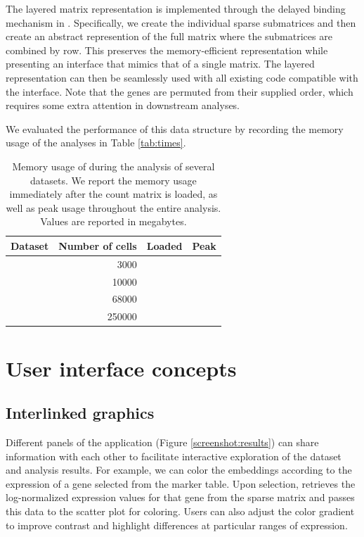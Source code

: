 \documentclass{article}
\begin{document}
The layered matrix representation is implemented through the delayed binding mechanism in .
Specifically, we create the individual sparse submatrices and then create an abstract represention of the full matrix where the submatrices are combined by row.
This preserves the memory-efficient representation while presenting an interface that mimics that of a single matrix.
The layered representation can then be seamlessly used with all existing code compatible with the  interface.
Note that the genes are permuted from their supplied order, which requires some extra attention in downstream analyses.

We evaluated the performance of this data structure by recording the memory usage of the analyses in Table \ref{tab:times}.

\begin{table}
\caption{Memory usage of  during the analysis of several datasets.
We report the memory usage immediately after the count matrix is loaded, as well as peak usage throughout the entire analysis.
Values are reported in megabytes.}
\label{tab:memory}
\begin{center}
\begin{tabular}{l r r r}
\hline
Dataset & \multicolumn{1}{c}{Number of cells} & \multicolumn{1}{c}{Loaded} & \multicolumn{1}{c}{Peak} \\
\hline
 & 3000 \\
 & 10000 \\
 & 68000 \\
 & 250000 \\
\hline
\end{tabular}
\end{center}
\end{table}

\section{User interface concepts}

\subsection{Interlinked graphics}

Different panels of the  application (Figure \ref{screenshot:results}) can share information with each other to facilitate interactive exploration of the dataset and analysis results.
For example, we can color the embeddings according to the expression of a gene selected from the marker table.
Upon selection,  retrieves the log-normalized expression values for that gene from the sparse matrix and passes this data to the scatter plot for coloring.
Users can also adjust the color gradient to improve contrast and highlight differences at particular ranges of expression.
\end{document}
